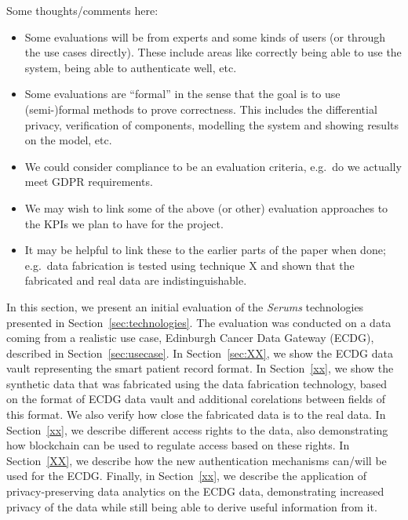 {\color{purple}
Some thoughts/comments here:
\begin{itemize}
    \item Some evaluations will be from experts and some kinds of users (or through the use cases directly). These include areas like correctly being able to use the system, being able to authenticate well, etc.
    \item Some evaluations are ``formal'' in the sense that the goal is to use (semi-)formal methods to prove correctness. This includes the differential privacy, verification of components, modelling the system and showing results on the model, etc.
    \item We could consider compliance to be an evaluation criteria, e.g.~do we actually meet GDPR requirements.
    \item We may wish to link some of the above (or other) evaluation approaches to the KPIs we plan to have for the project.
    \item It may be helpful to link these to the earlier parts of the paper when done; e.g.~data fabrication is tested using technique X and shown that the fabricated and real data are indistinguishable.
\end{itemize}}

In this section, we present an initial evaluation of the \emph{Serums} technologies presented in Section~\ref{sec:technologies}. The evaluation was conducted on a data coming from a realistic use case, Edinburgh Cancer Data Gateway (ECDG), described in Section~\ref{sec:usecase}. In Section~\ref{sec:XX}, we show the ECDG data vault representing the smart patient record format. In Section~\ref{xx}, we show the synthetic data that was fabricated using the data fabrication technology, based on the format of ECDG data vault and additional corelations between fields of this format. We also verify how close the fabricated data is to the real data. In Section~\ref{xx}, we describe different access rights to the data, also demonstrating how blockchain can be used to regulate access based on these rights. In Section~\ref{XX}, we describe how the new authentication mechanisms can/will be used for the ECDG. Finally, in Section~\ref{xx}, we describe the application of privacy-preserving data analytics on the ECDG data, demonstrating increased privacy of the data while still being able to derive useful information from it.
